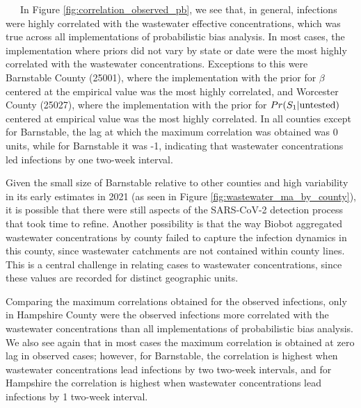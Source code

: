 \documentclass[12pt,twoside]{smiththesis}
\begin{document}
~~~In Figure \ref{fig:correlation_observed_pb}, we see that, in general, infections were highly correlated with the wastewater effective concentrations, which was true across all implementations of probabilistic bias analysis. In most cases, the implementation where priors did not vary by state or date were the most highly correlated with the wastewater concentrations. Exceptions to this were Barnstable County (25001), where the implementation with the prior for \(\beta\) centered at the empirical value was the most highly correlated, and Worcester County (25027), where the implementation with the prior for \(\\Pr(S_1|\text{untested})\) centered at empirical value was the most highly correlated. In all counties except for Barnstable, the lag at which the maximum correlation was obtained was 0 units, while for Barnstable it was -1, indicating that wastewater concentrations led infections by one two-week interval.

Given the small size of Barnstable relative to other counties and high variability in its early estimates in 2021 (as seen in Figure \ref{fig:wastewater_ma_by_county}), it is possible that there were still aspects of the SARS-CoV-2 detection process that took time to refine. Another possibility is that the way Biobot aggregated wastewater concentrations by county failed to capture the infection dynamics in this county, since wastewater catchments are not contained within county lines. This is a central challenge in relating cases to wastewater concentrations, since these values are recorded for distinct geographic units.

Comparing the maximum correlations obtained for the observed infections, only in Hampshire County were the observed infections more correlated with the wastewater concentrations than all implementations of probabilistic bias analysis. We also see again that in most cases the maximum correlation is obtained at zero lag in observed cases; however, for Barnstable, the correlation is highest when wastewater concentrations lead infections by two two-week intervals, and for Hampshire the correlation is highest when wastewater concentrations lead infections by 1 two-week interval.

~

~

~

~

~

~

~
\end{document}
